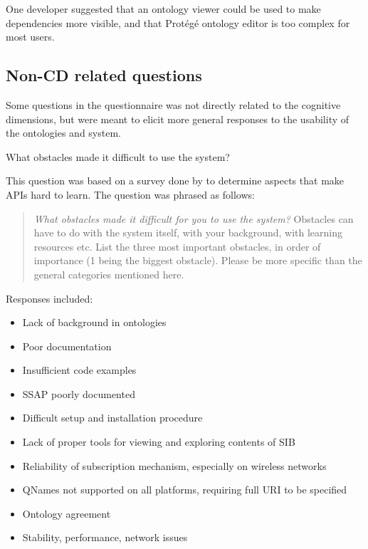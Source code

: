 One developer suggested that an ontology viewer could be used to make dependencies more visible, and that Prot\'eg\'e ontology editor is too complex for most users.


\subsection{Non-CD related questions}

Some questions in the questionnaire was not directly related to the cognitive dimensions, but were meant to elicit more general responses to the usability of the ontologies and system.\\

\begin{cdquestion}
	What obstacles made it difficult to use the system?
\end{cdquestion}

This question was based on a survey done by \cite{Robillard2009} to determine aspects that make \acp{API} hard to learn. The question was phrased as follows:

\begin{quote}
\emph{What obstacles made it difficult for you to use the system?} Obstacles can have to do with the system itself, with your background, with learning resources etc. List the three most important obstacles, in order of importance (1 being the biggest obstacle). Please be more specific than the general categories mentioned here.
\end{quote}

Responses included:

\begin{itemize}
	\item Lack of background in ontologies
	\item Poor documentation
	\item Insufficient code examples
	\item \ac{SSAP} poorly documented
	\item Difficult setup and installation procedure
	\item Lack of proper tools for viewing and exploring contents of \ac{SIB}
	\item Reliability of subscription mechanism, especially on wireless networks
	\item QNames not supported on all platforms, requiring full \ac{URI} to be specified
	\item Ontology agreement
	\item Stability, performance, network issues
\end{itemize}
\vspace{0.5cm}


